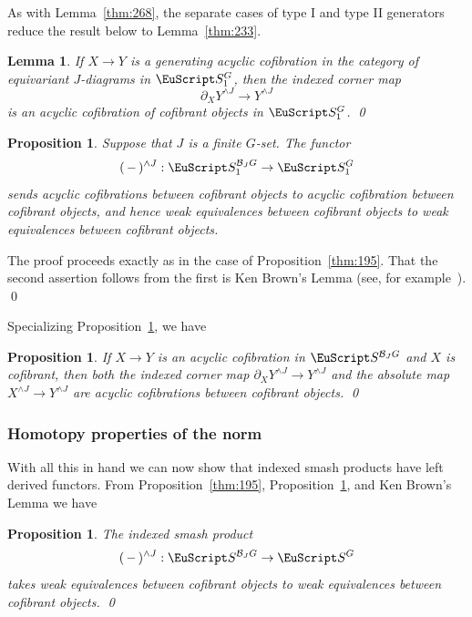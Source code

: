 \documentclass{amsart}
\newtheorem{lem}[equation]{Lemma}
\newtheorem{prop}[equation]{Proposition}
\theoremstyle{definition}
\theoremstyle{remark}
\newenvironment{pf}{\bigskip{\em Proof:\/}}{\qed\medskip}
\newcommand{\slot}{\,-\,}
\newcommand{\spectra}{\EuScript S}
\newcommand{\ugspectra}[1]{\spectra^{#1}}
\newcommand{\cat}[1]{{\mathcal #1}}
\newcommand{\augspectra}[1]{\spectra_{1}^{#1}}
\newcommand{\aspectra}[1]{\spectra_{1}^{#1}}
\begin{document}
As with Lemma~\ref{thm:268}, the separate cases of type I and type II
generators reduce the result below to Lemma~\ref{thm:233}.

\begin{lem}
\label{thm:196}
If $X\to Y$ is a generating acyclic cofibration in
the category of equivariant $J$-diagrams in $\augspectra{G}$, then the
indexed corner map
\[
\partial_{X}Y^{\wedge J}\to
Y^{\wedge J}
\]
is an acyclic cofibration of cofibrant objects in $\augspectra{G}$. \qed
\end{lem}



\begin{prop}
\label{thm:221}
Suppose that $J$ is a finite $G$-set.   The functor 
\[
(\slot)^{\wedge J}:\aspectra{\cat B_{J}G}\to \augspectra{G}
\]
sends acyclic cofibrations between cofibrant objects to acyclic
cofibration between cofibrant objects, and hence weak
equivalences between cofibrant objects to weak equivalences between
cofibrant objects.
\end{prop}

\begin{pf}
The proof proceeds exactly as in the case of
Proposition~\ref{thm:195}.   That the second assertion follows from
the first is Ken Brown's Lemma (see, for example~\cite[Lemma
1.1.12]{hovey99:_model}).
\end{pf}

Specializing Proposition~\ref{thm:221}, we have

\begin{prop}
\label{thm:232} If $X\to Y$ is an acyclic cofibration in
$\spectra^{\cat{B}_{J}G}$ and $X$ is cofibrant, then both the indexed
corner map $\partial_{X}Y^{\wedge J}\to Y^{\wedge J}$ and the absolute
map $X^{\wedge J}\to Y^{\wedge J}$ are acyclic cofibrations between
cofibrant objects.  \qed
\end{prop}

\subsubsection{Homotopy properties of the norm}
\label{sec:homot-prop-norm-1}

With all this in hand we can now show that indexed smash products have
left derived functors.  From Proposition~\ref{thm:195},
Proposition~\ref{thm:232}, and Ken Brown's Lemma we have

\begin{prop}
\label{thm:11}
The indexed smash product
\[
(\slot)^{\wedge J}:\spectra^{\cat{B}_{J}G}\to \ugspectra{G}
\]
takes weak equivalences between cofibrant objects to weak
equivalences between cofibrant objects.  \qed
\end{prop}
\end{document}
